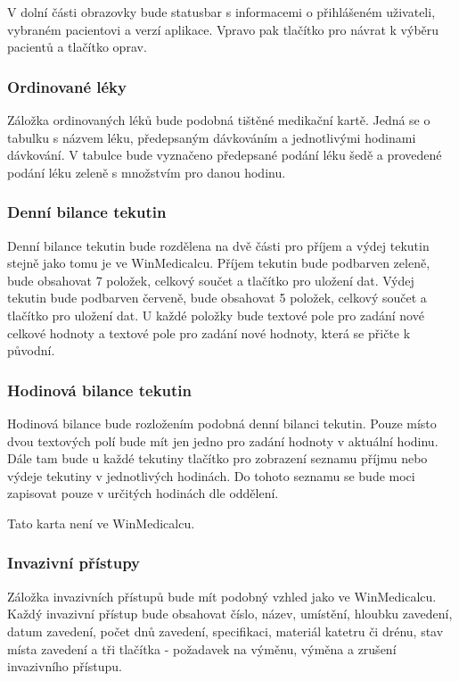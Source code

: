 V dolní části obrazovky bude statusbar s informacemi o přihlášeném uživateli, vybraném pacientovi a verzí aplikace. Vpravo pak tlačítko pro návrat k výběru pacientů a tlačítko oprav.

\subsubsection{Ordinované léky}

Záložka ordinovaných léků bude podobná tištěné medikační kartě. Jedná se o tabulku s názvem léku, předepsaným dávkováním a jednotlivými hodinami dávkování. V tabulce bude vyznačeno předepsané podání léku šedě a provedené podání léku zeleně s množstvím pro danou hodinu.

\subsubsection{Denní bilance tekutin}

Denní bilance tekutin bude rozdělena na dvě části pro příjem a výdej tekutin stejně jako tomu je ve WinMedicalcu. Příjem tekutin bude podbarven zeleně, bude obsahovat 7 položek, celkový součet a tlačítko pro uložení dat. Výdej tekutin bude podbarven červeně, bude obsahovat 5 položek, celkový součet a tlačítko pro uložení dat. U každé položky bude textové pole pro zadání nové celkové hodnoty a textové pole pro zadání nové hodnoty, která se přičte k původní.

\subsubsection{Hodinová bilance tekutin}

Hodinová bilance bude rozložením podobná denní bilanci tekutin. Pouze místo dvou textových polí bude mít jen jedno pro zadání hodnoty v aktuální hodinu. Dále tam bude u každé tekutiny tlačítko pro zobrazení seznamu příjmu nebo výdeje tekutiny v jednotlivých hodinách. Do tohoto seznamu se bude moci zapisovat pouze v určitých hodinách dle oddělení.

Tato karta není ve WinMedicalcu.

\subsubsection{Invazivní přístupy}

Záložka invazivních přístupů bude mít podobný vzhled jako ve WinMedicalcu. Každý invazivní přístup bude obsahovat číslo, název, umístění, hloubku zavedení, datum zavedení, počet dnů zavedení, specifikaci, materiál katetru či drénu, stav místa zavedení a tři tlačítka - požadavek na výměnu, výměna a zrušení invazivního přístupu.

